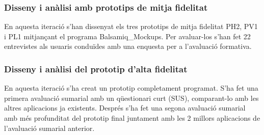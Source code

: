 \subsubsection{Disseny i anàlisi amb prototips de mitja fidelitat}
En aquesta iteració s'han dissenyat els tres prototips de mitja fidelitat PH2, PV1 i PL1 mitjançant el programa \gls{Balsamiq_Mockups}. Per avaluar-los s'han fet 22 entrevistes als usuaris conduïdes amb una enquesta per a l'avaluació formativa.
\subsubsection{Disseny i anàlisi del prototip d'alta fidelitat}
En aquesta iteració s'ha creat un prototip completament programat. S'ha fet una primera avaluació sumarial amb un qüestionari curt (SUS), comparant-lo amb les altres aplicacions ja existents. Després s'ha fet una segona avaluació sumarial amb més profunditat del prototip final juntament amb les 2 millors aplicacions de l'avaluació sumarial anterior. 